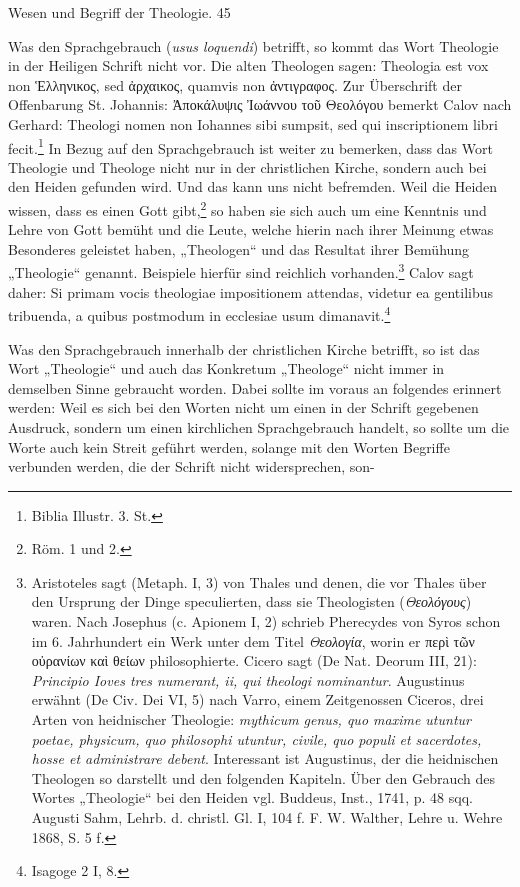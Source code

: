
\begin{center}
Wesen und Begriff der Theologie. \hfill 45
\end{center}

\setcounter{footnote}{164} %

Was den Sprachgebrauch (\emph{usus loquendi}) betrifft, so kommt das Wort Theologie in der Heiligen Schrift nicht vor. Die alten Theologen sagen: Theologia est vox non Ἑλληνικος, sed ἀρχαικος, quamvis non ἀντιγραφος. Zur Überschrift der Offenbarung St. Johannis: Ἀποκάλυψις Ἰωάννου τοῦ Θεολόγου bemerkt Calov nach Gerhard: Theologi nomen non Iohannes sibi sumpsit, sed qui inscriptionem libri fecit.\footnote{Biblia Illustr. 3. St.} In Bezug auf den Sprachgebrauch ist weiter zu bemerken, dass das Wort Theologie und Theologe nicht nur in der christlichen Kirche, sondern auch bei den Heiden gefunden wird. Und das kann uns nicht befremden. Weil die Heiden wissen, dass es einen Gott gibt,\footnote{Röm. 1 und 2.} so haben sie sich auch um eine Kenntnis und Lehre von Gott bemüht und die Leute, welche hierin nach ihrer Meinung etwas Besonderes geleistet haben, „Theologen“ und das Resultat ihrer Bemühung „Theologie“ genannt. Beispiele hierfür sind reichlich vorhanden.\footnote{Aristoteles sagt (Metaph. I, 3) von Thales und denen, die vor Thales über den Ursprung der Dinge speculierten, dass sie Theologisten (\emph{Θεολόγους}) waren. Nach Josephus (c. Apionem I, 2) schrieb Pherecydes von Syros schon im 6. Jahrhundert ein Werk unter dem Titel \emph{Θεολογία}, worin er περὶ τῶν οὐρανίων καὶ θείων philosophierte. Cicero sagt (De Nat. Deorum III, 21): \emph{Principio Ioves tres numerant, ii, qui theologi nominantur}. Augustinus erwähnt (De Civ. Dei VI, 5) nach Varro, einem Zeitgenossen Ciceros, drei Arten von heidnischer Theologie: \emph{mythicum genus, quo maxime utuntur poetae, physicum, quo philosophi utuntur, civile, quo populi et sacerdotes, hosse et administrare debent}. Interessant ist Augustinus, der die heidnischen Theologen so darstellt und den folgenden Kapiteln. Über den Gebrauch des Wortes „Theologie“ bei den Heiden vgl. Buddeus, Inst., 1741, p. 48 sqq. Augusti Sahm, Lehrb. d. christl. Gl. I, 104 f. F. W. Walther, Lehre u. Wehre 1868, S. 5 f.} Calov sagt daher: Si primam vocis theologiae impositionem attendas, videtur ea gentilibus tribuenda, a quibus postmodum in ecclesiae usum dimanavit.\footnote{Isagoge 2 I, 8.}

Was den Sprachgebrauch innerhalb der christlichen Kirche betrifft, so ist das Wort „Theologie“ und auch das Konkretum „Theologe“ nicht immer in demselben Sinne gebraucht worden. Dabei sollte im voraus an folgendes erinnert werden: Weil es sich bei den Worten nicht um einen in der Schrift gegebenen Ausdruck, sondern um einen kirchlichen Sprachgebrauch handelt, so sollte um die Worte auch kein Streit geführt werden, solange mit den Worten Begriffe verbunden werden, die der Schrift nicht widersprechen, son-
